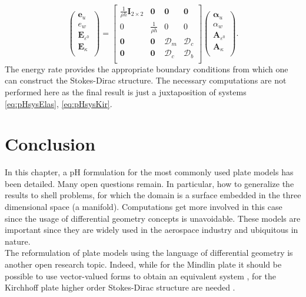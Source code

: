 \begin{equation}
\begin{pmatrix}
\bm{e}_u \\
e_w \\
\bm{E}_{\varepsilon^0} \\
\bm{E}_{\kappa} \\
\end{pmatrix}
= 
\begin{bmatrix}
\frac{1}{\rho h}\bm{I}_{2 \times 2} & \bm{0} & \bm{0} &  \bm{0} \\
0 & \frac{1}{\rho h} & 0 & 0  \\
\bm{0} & \bm{0} & \bm{\mathcal{D}}_m & \bm{\mathcal{D}}_c \\
\bm{0} & \bm{0} & \bm{\mathcal{D}}_c & \bm{\mathcal{D}}_b \\
\end{bmatrix}
\begin{pmatrix}
\bm\alpha_u \\
\alpha_w \\
\bm{A}_{\varepsilon^0} \\
\bm{A}_\kappa \\
\end{pmatrix}.
\end{equation}
The energy rate provides the appropriate boundary conditions from which one can construct the Stokes-Dirac structure. The necessary computations are not performed here as the final result is just a juxtaposition of systems \eqref{eq:pHsysElas}, \eqref{eq:pHsysKir}.


\section{Conclusion}

In this chapter, a pH formulation for the most commonly used plate models has been detailed. Many open questions remain. In particular, how to generalize the results to shell problems, for which the domain is a surface embedded in the three dimensional space (a manifold). Computations get more involved in this case since the usage of differential geometry concepts is unavoidable. These models are important since they are widely used in the aerospace industry and ubiquitous in nature. \\

The reformulation of plate models using the language of differential geometry is another open research topic. Indeed, while for the Mindlin plate it should be possible to use vector-valued forms to obtain an equivalent system \cite{falk2008finite}, for the Kirchhoff plate higher order Stokes-Dirac structure are needed \cite{nishida2004}. 